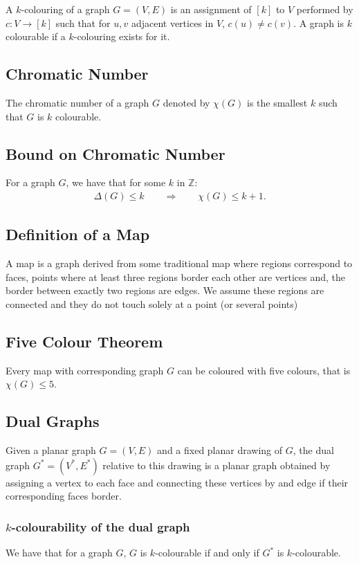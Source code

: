 \documentclass[a4paper, 12pt, twoside]{article}
\begin{document}
A $k$-colouring of a graph $G = (V, E)$ is an assignment of $[k]$ to $V$ 
performed by $c : V \to [k]$ such that for $u, v$ adjacent vertices in $V$, 
$c(u) \neq c(v)$. A graph is $k$ colourable if a $k$-colouring exists for it.

\subsection{Chromatic Number}

The chromatic number of a graph $G$ denoted by $\chi(G)$ is the smallest 
$k$ such that $G$ is $k$ colourable.

\subsection{Bound on Chromatic Number}

For a graph $G$, we have that for some $k$ in $\mathbb{Z}$: \begin{gather*}
  \Delta(G) \leq k \qquad \Rightarrow \qquad \chi(G) \leq k + 1.
\end{gather*}

\subsection{Definition of a Map}

A map is a graph derived from some traditional map where regions correspond to faces,
points where at least three regions border each other are vertices and, the border between
exactly two regions are edges. We assume these regions are connected and they do not touch
solely at a point (or several points)

\subsection{Five Colour Theorem}

Every map with corresponding graph $G$ can be coloured with five colours, 
that is $\chi(G) \leq 5$.

\subsection{Dual Graphs}

Given a planar graph $G = (V, E)$ and a fixed planar drawing of $G$, the dual graph
$G^* = (V^*, E^*)$ relative to this drawing is a planar graph obtained by assigning
a vertex to each face and connecting these vertices by and edge if their corresponding
faces border.

\subsubsection{$k$-colourability of the dual graph}

We have that for a graph $G$, $G$ is $k$-colourable if and only if $G^*$ is 
$k$-colourable.
\end{document}
